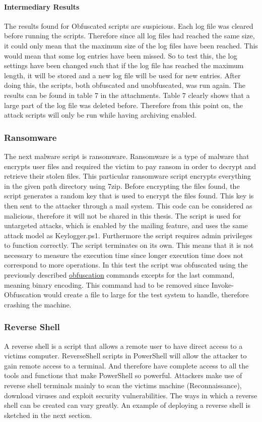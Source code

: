 \documentclass{article}%
\begin{document}
\paragraph{Intermediary Results}\hfill\newline
The results found for Obfuscated scripts are suspicious. Each log file was cleared before running the scripts. Therefore since all log files had reached the same size, it could only mean that the maximum size of the log files have been reached. This would mean that some log entries have been missed. So to test this, the log settings have been changed such that if the log file has reached the maximum length, it will be stored and a new log file will be used for new entries. After doing this, the scripts, both obfuscated and unobfuscated, was run again. The results can be found in table $7$ in the attachments. Table $7$ clearly shows that a large part of the log file was deleted before. Therefore from this point on, the attack scripts will only be run while having archiving enabled.

\subsubsection{Ransomware}
The next malware script is ransomware. Ransomware is a type of malware that encrypts user files and required the victim to pay ransom in order to decrypt and retrieve their stolen files. This particular ransomware script encrypts everything in the given path directory using 7zip. Before encrypting the files found, the script generates a random key that is used to encrypt the files found. This key is then sent to the attacker through a mail system. This code can be considered as malicious, therefore it will not be shared in this thesis. The script is used for untargeted attacks, which is enabled by the mailing feature, and uses the same attack model as Keylogger.ps1. Furthermore the script requires admin privileges to function correctly. The script terminates on its own. This means that it is not necessary to measure the execution time since longer execution time does not correspond to more operations.
In this test the script was obfuscated using the previously described \hyperlink{obfuscation}{obfuscation} commands excepts for the last command, meaning binary encoding. This command had to be removed since Invoke-Obfuscation would create a file to large for the test system to handle, therefore crashing the machine.

\subsubsection{Reverse Shell}
A reverse shell is a script that allows a remote user to have direct access to a victims computer. ReverseShell scripts in PowerShell will allow the attacker to gain remote access to a terminal. And therefore have complete access to all the tools and functions that make PowerShell so powerful. Attackers make use of reverse shell terminals mainly to scan the victims machine (Reconnaissance), download viruses and exploit security vulnerabilities. The ways in which a reverse shell can be created can vary greatly. An example of deploying a reverse shell is sketched in the next section.
\end{document}
